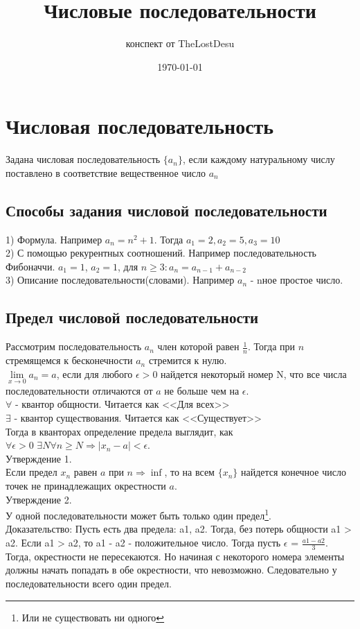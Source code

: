 \documentclass[a4paper,12pt]{article}
\author{конспект от TheLostDesu}
\title{Числовые последовательности}
\date{\today}
\begin{document}
\maketitle
\section{Числовая последовательность}
Задана числовая последовательность $\{a_n\}$, если каждому натуральному числу поставлено в соответствие вещественное число $a_n$
\subsection{Способы задания числовой последовательности}
1) Формула. Например $a_n = n^2 + 1$. Тогда $a_1 = 2, a_2 = 5, a_3 = 10$\\
2) С помощью рекурентных соотношений. Например последовательность Фибоначчи. $a_1 = 1$, $a_2 = 1$, для $n\geq 3: a_n = a_{n-1} + a_{n-2}$ \\
3) Описание последовательности(словами). Например $a_n$ - nное простое число.\\
\subsection{Предел числовой последовательности}
Рассмотрим последовательность $a_n$ член которой равен $\frac{1}{n}$. Тогда при $n$ стремящемся к бесконечности $a_n$ стремится к нулю. \\
$\lim\limits_{x\to 0} a_n=a$, если для любого $\epsilon > 0$ найдется некоторый номер N, что все числа последовательности отличаются от $a$ не больше чем на $\epsilon$.\\
$\forall$ - квантор общности. Читается как <<Для всех>>\\
$\exists$ - квантор существования. Читается как <<Существует>>\\
Тогда в кванторах определение предела выглядит, как\\
$\forall \epsilon > 0$ $\exists N \forall n \geq N \Rightarrow |x_n - a| < \epsilon.$\\
Утверждение 1. \\
Если предел $x_n$ равен $a$ при $n\Rightarrow \inf$, то на всем $\{x_n\}$ найдется конечное число точек не принадлежащих окрестности $a$.\\
Утверждение 2. \\ 
У одной последовательности может быть только один предел\footnote{Или не существовать ни одного}. \\
Доказательство: Пусть есть два предела: a1, a2. Тогда, без потерь общности a1 > a2. Если a1 > a2, то a1 - a2 - положительное число. Тогда пусть $\epsilon $ = $\frac{a1 - a2}{3}$. Тогда, окрестности не пересекаются. Но начиная с некоторого номера элементы должны начать попадать в обе окрестности, что невозможно. Следовательно у последовательности всего один предел.
\end{document}
